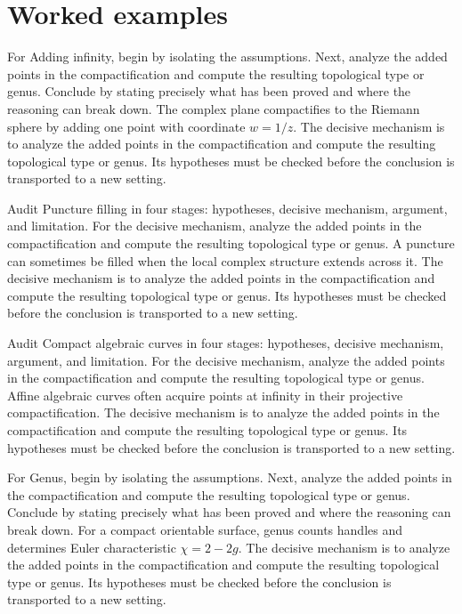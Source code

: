 \section{Worked examples}

\begin{example}\label{ex:iv26-worked-01}
For Adding infinity, begin by isolating the assumptions. Next, analyze the added points in the compactification and compute the resulting topological type or genus. Conclude by stating precisely what has been proved and where the reasoning can break down. The complex plane compactifies to the Riemann sphere by adding one point with coordinate $w=1/z$. The decisive mechanism is to analyze the added points in the compactification and compute the resulting topological type or genus. Its hypotheses must be checked before the conclusion is transported to a new setting.
\end{example}

\begin{example}\label{ex:iv26-worked-02}
Audit Puncture filling in four stages: hypotheses, decisive mechanism, argument, and limitation. For the decisive mechanism, analyze the added points in the compactification and compute the resulting topological type or genus. A puncture can sometimes be filled when the local complex structure extends across it. The decisive mechanism is to analyze the added points in the compactification and compute the resulting topological type or genus. Its hypotheses must be checked before the conclusion is transported to a new setting.
\end{example}

\begin{example}\label{ex:iv26-worked-03}
Audit Compact algebraic curves in four stages: hypotheses, decisive mechanism, argument, and limitation. For the decisive mechanism, analyze the added points in the compactification and compute the resulting topological type or genus. Affine algebraic curves often acquire points at infinity in their projective compactification. The decisive mechanism is to analyze the added points in the compactification and compute the resulting topological type or genus. Its hypotheses must be checked before the conclusion is transported to a new setting.
\end{example}

\begin{example}\label{ex:iv26-worked-04}
For Genus, begin by isolating the assumptions. Next, analyze the added points in the compactification and compute the resulting topological type or genus. Conclude by stating precisely what has been proved and where the reasoning can break down. For a compact orientable surface, genus counts handles and determines Euler characteristic $\chi=2-2g$. The decisive mechanism is to analyze the added points in the compactification and compute the resulting topological type or genus. Its hypotheses must be checked before the conclusion is transported to a new setting.
\end{example}

